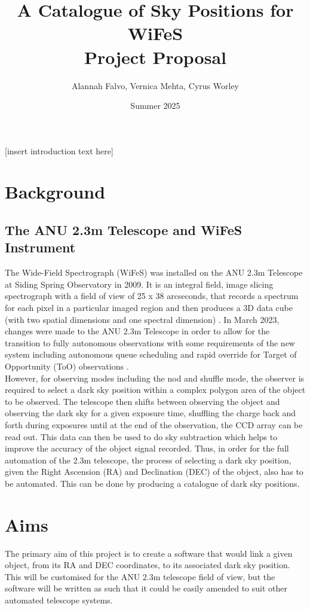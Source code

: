 \documentclass[11pt]{article}
\title{%
    \huge A Catalogue of Sky Positions for WiFeS \\
    \Large \textbf{Project Proposal}}
\author{Alannah Falvo, Vernica Mehta, Cyrus Worley}
\date{Summer 2025}
\begin{document}
\maketitle

[insert introduction text here] \\

\section{Background}
\subsection{The ANU 2.3m Telescope and WiFeS Instrument}
The Wide-Field Spectrograph (WiFeS) was installed on the ANU 2.3m Telescope at Siding Spring Observatory in 2009. It is an integral field, image slicing spectrograph with a field of view of 25 x 38 arcseconds, that records a spectrum for each pixel in a particular imaged region and then produces a 3D data cube (with two spatial dimensions and one spectral dimension) \cite{dopita_wide_2007}.  In March 2023, changes were made to the ANU 2.3m Telescope in order to allow for the transition to fully autonomous observations with some requirements of the new system including autonomous queue scheduling and rapid override for Target of Opportunity (ToO) observations \cite{price_converting_2024}. \\

However, for observing modes including the nod and shuffle mode, the observer is required to select a dark sky position within a complex polygon area of the object to be observed. The telescope then shifts between observing the object and observing the dark sky for a given exposure time, shuffling the charge back and forth during exposures until at the end of the observation, the CCD array can be read out. This data can then be used to do sky subtraction which helps to improve the accuracy of the object signal recorded. Thus, in order for the full automation of the 2.3m telescope, the process of selecting a dark sky position, given the Right Ascension (RA) and Declination (DEC) of the object, also has to be automated. This can be done by producing a catalogue of dark sky positions. 


\section{Aims}
The primary aim of this project is to create a software that would link a given object, from its RA and DEC coordinates, to its associated dark sky position. This will be customised for the ANU 2.3m telescope field of view, but the software will be written as such that it could be easily amended to suit other automated telescope systems. \\
\end{document}

